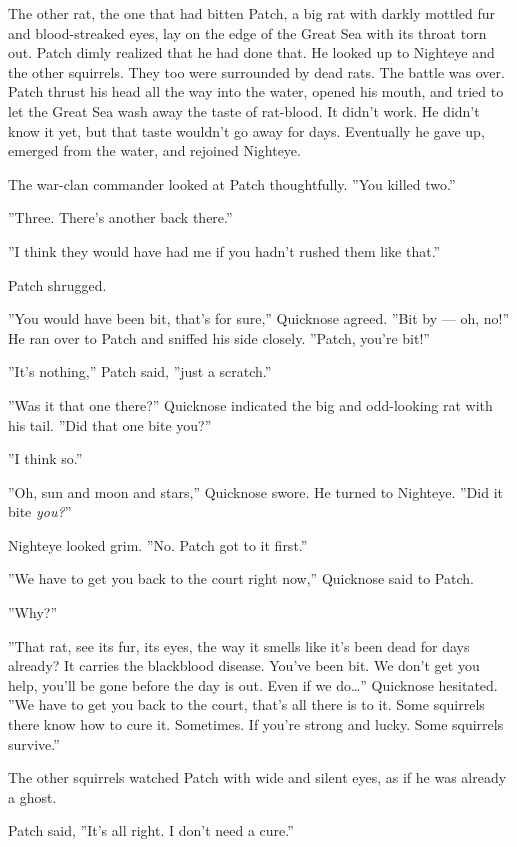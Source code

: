 \documentclass[12pt]{book}
\begin{document}
The other rat, the one that had bitten Patch, a big rat with darkly
mottled fur and blood-streaked eyes, lay on the edge of the Great Sea
with its throat torn out. Patch dimly realized that he had done
that. He looked up to Nighteye and the other squirrels. They too were
surrounded by dead rats. The battle was over. Patch thrust his head
all the way into the water, opened his mouth, and tried to let the
Great Sea wash away the taste of rat-blood. It didn't work. He didn't
know it yet, but that taste wouldn't go away for days. Eventually he
gave up, emerged from the water, and rejoined Nighteye.

The war-clan commander looked at Patch thoughtfully. ''You killed
two.''

''Three. There's another back there.''

''I think they would have had me if you hadn't rushed them like
that.''

Patch shrugged.

''You would have been bit, that's for sure,'' Quicknose agreed. ''Bit
by --- oh, no!'' He ran over to Patch and sniffed his side
closely. ''Patch, you're bit!''

''It's nothing,'' Patch said, ''just a scratch.''

''Was it that one there?'' Quicknose indicated the big and odd-looking
rat with his tail. ''Did that one bite you?''

''I think so.''

''Oh, sun and moon and stars,'' Quicknose swore. He turned to
Nighteye. ''Did it bite \textit{you?}''

Nighteye looked grim. ''No. Patch got to it first.''

''We have to get you back to the court right now,'' Quicknose said to
Patch.

''Why?''

''That rat, see its fur, its eyes, the way it smells like it's been
dead for days already? It carries the blackblood disease. You've been
bit. We don't get you help, you'll be gone before the day is out. Even
if we do\ldots{}'' Quicknose hesitated. ''We have to get you back to
the court, that's all there is to it. Some squirrels there know how to
cure it. Sometimes. If you're strong and lucky. Some squirrels
survive.''

The other squirrels watched Patch with wide and silent eyes, as if he
was already a ghost.

Patch said, ''It's all right. I don't need a cure.''
\end{document}
